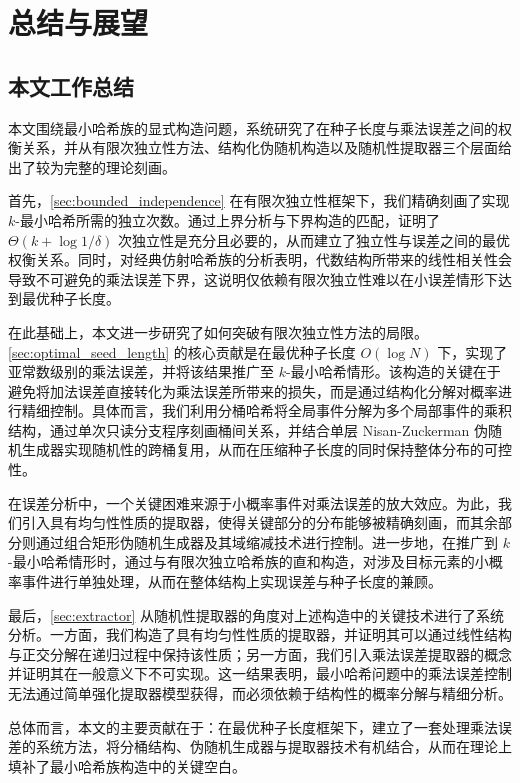 \section{总结与展望}\label{sec:summary}

\subsection{本文工作总结}

本文围绕最小哈希族的显式构造问题，系统研究了在种子长度与乘法误差之间的权衡关系，并从有限次独立性方法、结构化伪随机构造以及随机性提取器三个层面给出了较为完整的理论刻画。

首先，\ref{sec:bounded_independence} 在有限次独立性框架下，我们精确刻画了实现 $k$-最小哈希所需的独立次数。通过上界分析与下界构造的匹配，证明了 $\Theta(k + \log 1/\delta)$ 次独立性是充分且必要的，从而建立了独立性与误差之间的最优权衡关系。同时，对经典仿射哈希族的分析表明，代数结构所带来的线性相关性会导致不可避免的乘法误差下界，这说明仅依赖有限次独立性难以在小误差情形下达到最优种子长度。

在此基础上，本文进一步研究了如何突破有限次独立性方法的局限。\ref{sec:optimal_seed_length} 的核心贡献是在最优种子长度 $O(\log N)$ 下，实现了亚常数级别的乘法误差，并将该结果推广至 $k$-最小哈希情形。该构造的关键在于避免将加法误差直接转化为乘法误差所带来的损失，而是通过结构化分解对概率进行精细控制。具体而言，我们利用分桶哈希将全局事件分解为多个局部事件的乘积结构，通过单次只读分支程序刻画桶间关系，并结合单层 Nisan-Zuckerman 伪随机生成器实现随机性的跨桶复用，从而在压缩种子长度的同时保持整体分布的可控性。

在误差分析中，一个关键困难来源于小概率事件对乘法误差的放大效应。为此，我们引入具有均匀性性质的提取器，使得关键部分的分布能够被精确刻画，而其余部分则通过组合矩形伪随机生成器及其域缩减技术进行控制。进一步地，在推广到 $k$-最小哈希情形时，通过与有限次独立哈希族的直和构造，对涉及目标元素的小概率事件进行单独处理，从而在整体结构上实现误差与种子长度的兼顾。

最后，\ref{sec:extractor} 从随机性提取器的角度对上述构造中的关键技术进行了系统分析。一方面，我们构造了具有均匀性性质的提取器，并证明其可以通过线性结构与正交分解在递归过程中保持该性质；另一方面，我们引入乘法误差提取器的概念并证明其在一般意义下不可实现。这一结果表明，最小哈希问题中的乘法误差控制无法通过简单强化提取器模型获得，而必须依赖于结构性的概率分解与精细分析。

总体而言，本文的主要贡献在于：在最优种子长度框架下，建立了一套处理乘法误差的系统方法，将分桶结构、伪随机生成器与提取器技术有机结合，从而在理论上填补了最小哈希族构造中的关键空白。

